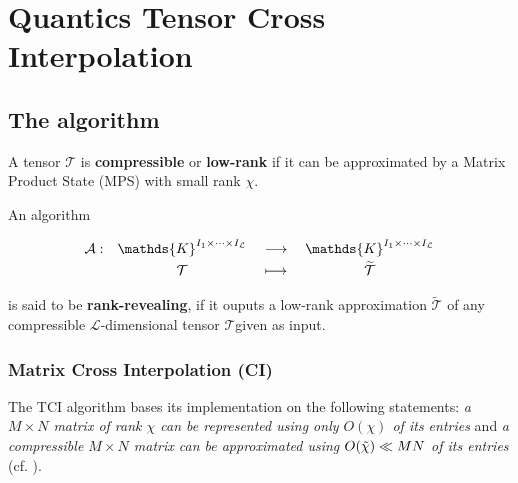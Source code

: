 \chapter{Quantics Tensor Cross Interpolation}
\label{chap:QTCI}


\section{The algorithm}

\begin{definition}
	A tensor $\mathcal{T}$ is {\normalfont \textbf{compressible}} or {\normalfont \textbf{low-rank}} if it can be approximated by a Matrix Product State (MPS) with small rank $\chi$.
	\label{def:compresstensor}
\end{definition}

\begin{definition}
	An algorithm 
	
	\[
		\renewcommand{\arraystretch}{1.1}%
		\begin{array}{r c >{{}}c<{{}} c} 
		\mathcal{A}: &
		\mathds{K}^{I_1 \times \dots \times I_\mathcal{L}} &
		\longrightarrow &
		\mathds{K}^{I_1 \times \dots \times I_\mathcal{L}} \\[2pt]
		& \mathcal{T} &
		\longmapsto &
		\widetilde{\mathcal{T}}
		\end{array}
	\]

	is said to be {\normalfont \textbf{rank-revealing}}, if it ouputs a low-rank approximation $\widetilde{\mathcal{T}}$ of any compressible $\mathcal{L}$-dimensional tensor $\mathcal{T}$\footnotemark given as input.
	\label{def:rkralg}
\end{definition}


\subsection{Matrix Cross Interpolation (CI)}
The TCI algorithm bases its implementation on the following statements: \textit{a $M\times N$ matrix of rank $\chi$ can be represented using only $O(\chi)$ of its entries} and \textit{a compressible $M\times N$ matrix can be approximated using  $O({\tilde \chi}) \ll MN$ of its entries} (cf. ).

